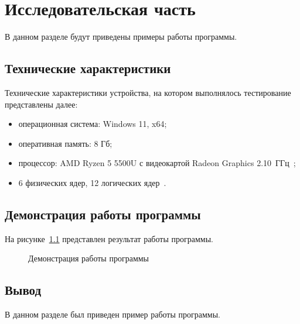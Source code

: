 \chapter{Исследовательская часть}

В данном разделе будут приведены примеры работы программы.

\section{Технические характеристики}

Технические характеристики устройства, на котором выполнялось тестирование представлены далее:
\begin{itemize}[label={---}]
	\item операционная система: Windows 11, x64;
	\item оперативная память: 8 Гб;
	\item процессор: AMD Ryzen 5 5500U с видеокартой Radeon Graphics 2.10~ГГц~\cite{amd};
	\item 6 физических ядер, 12 логических ядер~\cite{amd}.
\end{itemize}

\section{Демонстрация работы программы}

На рисунке~\ref{img:dem} представлен результат работы программы.

\begin{figure}[H]
	\caption{Демонстрация работы программы}
	\label{img:dem}
\end{figure}

\section{Вывод}

В данном разделе был приведен пример работы программы.
